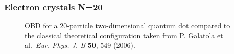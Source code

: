 \begin{frame}
\frametitle{Electron crystals N=20}
 \begin{figure}
 \begin{center}
  \label{fig:wigner20}
  \caption{OBD for a 20-particle two-dimensional quantum dot compared to the classical theoretical configuration taken from P. Galatola et al.~\textit{Eur. Phys. J. B} \textbf{50}, 549 (2006).}
 \end{center}
\end{figure}
\end{frame}

